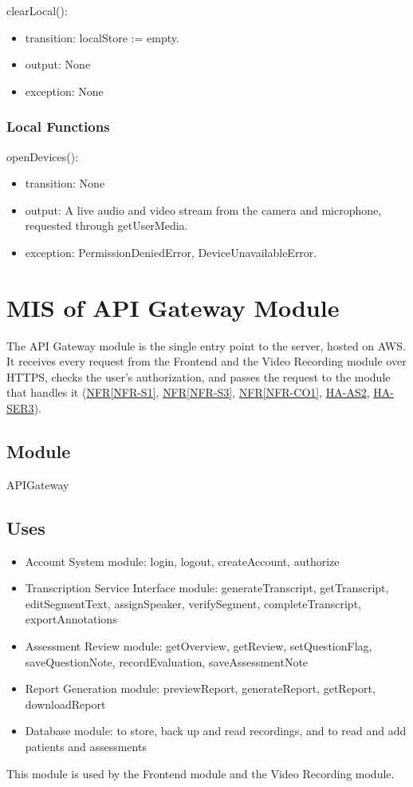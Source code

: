 \documentclass[12pt, titlepage]{article}
\newcommand{\srsref}[2]{\href{https://github.com/Nour-Fawaz/MacaBoca/blob/main/pdfs/SRS/SRS.pdf}{#1\ref*{#2}}}
\newcommand{\hazref}[1]{\href{https://github.com/Nour-Fawaz/MacaBoca/blob/main/pdfs/HazardAnalysis/HazardAnalysis.pdf}{#1}}
\begin{document}
\noindent clearLocal():
\begin{itemize}
\item transition: localStore := empty.
\item output: None
\item exception: None
\end{itemize}

\subsubsection{Local Functions}

\noindent openDevices():
\begin{itemize}
\item transition: None
\item output: A live audio and video stream from the camera and microphone,
  requested through getUserMedia.
\item exception: PermissionDeniedError, DeviceUnavailableError.
\end{itemize}

\newpage

\section{MIS of API Gateway Module}\label{APIGateway}
The API Gateway module is the single entry point to the server, hosted on AWS. It receives
every request from the Frontend and the Video Recording module over HTTPS,
checks the user's authorization, and passes the request to the
module that handles it (\srsref{NFR}{NFR-S1}, \srsref{NFR}{NFR-S3},
\srsref{NFR}{NFR-CO1}, \hazref{HA-AS2}, \hazref{HA-SER3}).

\subsection{Module}
APIGateway

\subsection{Uses}
\begin{itemize}
\item Account System module: login, logout, createAccount, authorize
\item Transcription Service Interface module: generateTranscript,
  getTranscript, editSegmentText, assignSpeaker, verifySegment,
  completeTranscript, exportAnnotations
\item Assessment Review module: getOverview, getReview, setQuestionFlag,
  saveQuestionNote, recordEvaluation, saveAssessmentNote
\item Report Generation module: previewReport, generateReport, getReport,
  downloadReport
\item Database module: to store, back up and read recordings, and to read and
  add patients and assessments
\end{itemize}
This module is used by the Frontend module and the Video Recording module.
\end{document}
